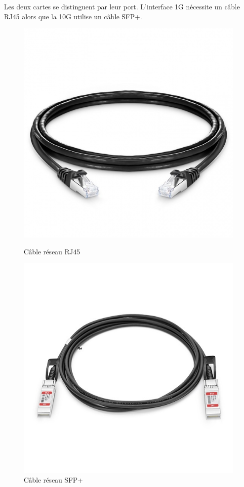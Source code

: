 \documentclass[12pt, a4paper, twoside]{article}
\begin{document}
\newpage
Les deux cartes se distinguent par leur port.
L'interface 1G nécessite un câble RJ45 alors que la 10G utilise un câble SFP+.
\begin{figure}[!h]
    \begin{minipage}[b]{0.45\textwidth}
        \centering
        \includegraphics[width=\textwidth,height=\textheight,keepaspectratio]{src/img_rj45.jpg}
        \caption{Câble réseau RJ45}
        \label{fig:rj45}
    \end{minipage}
    \hfill
    \begin{minipage}[b]{0.45\textwidth}
        \centering
        \includegraphics[width=\textwidth,height=\textheight,keepaspectratio]{src/img_sfp.jpg}
        \caption{Câble réseau SFP+}
        \label{fig:sfp}
    \end{minipage}%
\end{figure}
\end{document}
